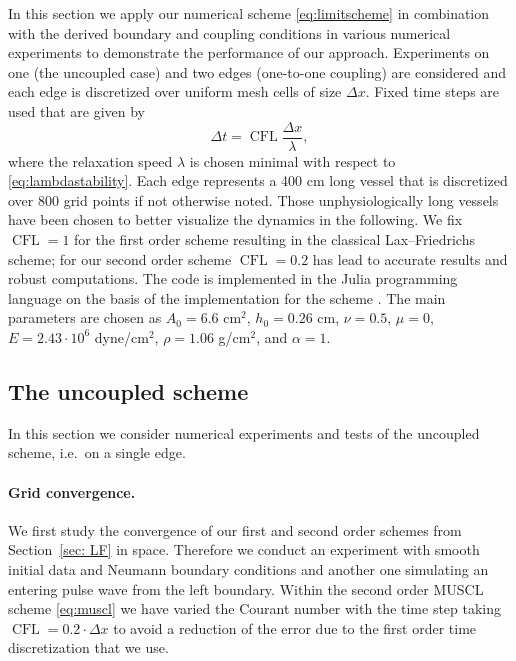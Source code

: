 \documentclass[a4paper,11pt]{article}
\newcommand{\CFL}{\operatorname{CFL}}
\begin{document}
In this section we apply our numerical scheme \eqref{eq:limitscheme} in combination with the derived boundary and coupling conditions in various numerical experiments to demonstrate the performance of our approach. Experiments on one (the uncoupled case) and two edges (one-to-one coupling) are considered and each edge is discretized over uniform mesh cells of size $\Delta x$. Fixed time steps are used that are given by 
\[
  \Delta t = \CFL \frac{\Delta x}{\lambda},
  \]
where the relaxation speed $\lambda$ is chosen minimal with respect to \eqref{eq:lambdastability}. Each edge represents a 400 cm long vessel that is discretized over 800 grid points if not otherwise noted. Those unphysiologically long vessels have been chosen to better visualize the dynamics in the following. We fix $\CFL=1$ for the first order scheme resulting in the classical Lax--Friedrichs scheme; for our second order scheme $\CFL=0.2$ has lead to accurate results and robust computations.
The code is implemented in the Julia programming language \cite{Julia} on the basis of the implementation for the scheme \cite{CodeCentralNetworkScheme}. The main parameters are chosen as $A_0=6.6$ cm$^2$, $h_0=0.26$ cm, $\nu = 0.5$, $\mu=0$,  $E=2.43 \cdot 10^6$ dyne/cm$^2$, $\rho=1.06$ g/cm$^2$, and $\alpha=1$.

\subsection{The uncoupled scheme}
In this section we consider numerical experiments and tests of the uncoupled scheme, i.e.\ on a single edge. 

\paragraph{Grid convergence.}
We first study the convergence of our first and second order schemes from Section~\ref{sec: LF} in space. Therefore we conduct an experiment with smooth initial data and Neumann boundary conditions and another one simulating an entering pulse wave from the left boundary. Within the second order MUSCL scheme \eqref{eq:muscl} we have varied the Courant number with the time step taking $\CFL=0.2 \cdot \Delta x$ to avoid a reduction of the error due to the first order time discretization that we use.
\end{document}
